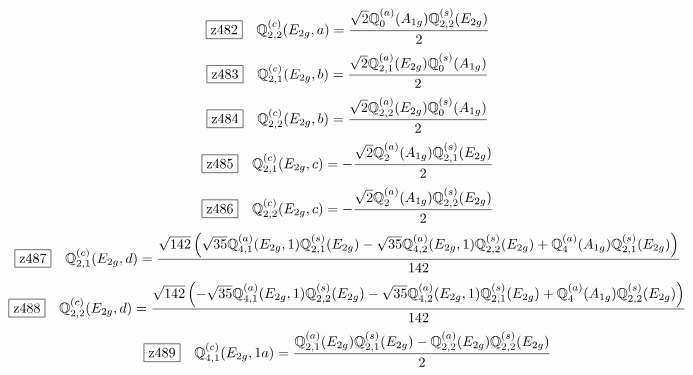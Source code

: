 \documentclass[fleqn,10pt,landscape]{jsarticle}
\begin{document}
\begin{dmath*}
\hspace*{3mm}\fbox{z482}\quad \mathbb{Q}_{2,2}^{(c)}(E_{2g},a)=\frac{\sqrt{2} \mathbb{Q}_{0}^{(a)}(A_{1g}) \mathbb{Q}_{2,2}^{(s)}(E_{2g})}{2}
\end{dmath*}
\begin{dmath*}
\hspace*{3mm}\fbox{z483}\quad \mathbb{Q}_{2,1}^{(c)}(E_{2g},b)=\frac{\sqrt{2} \mathbb{Q}_{2,1}^{(a)}(E_{2g}) \mathbb{Q}_{0}^{(s)}(A_{1g})}{2}
\end{dmath*}
\begin{dmath*}
\hspace*{3mm}\fbox{z484}\quad \mathbb{Q}_{2,2}^{(c)}(E_{2g},b)=\frac{\sqrt{2} \mathbb{Q}_{2,2}^{(a)}(E_{2g}) \mathbb{Q}_{0}^{(s)}(A_{1g})}{2}
\end{dmath*}
\begin{dmath*}
\hspace*{3mm}\fbox{z485}\quad \mathbb{Q}_{2,1}^{(c)}(E_{2g},c)=- \frac{\sqrt{2} \mathbb{Q}_{2}^{(a)}(A_{1g}) \mathbb{Q}_{2,1}^{(s)}(E_{2g})}{2}
\end{dmath*}
\begin{dmath*}
\hspace*{3mm}\fbox{z486}\quad \mathbb{Q}_{2,2}^{(c)}(E_{2g},c)=- \frac{\sqrt{2} \mathbb{Q}_{2}^{(a)}(A_{1g}) \mathbb{Q}_{2,2}^{(s)}(E_{2g})}{2}
\end{dmath*}
\begin{dmath*}
\hspace*{3mm}\fbox{z487}\quad \mathbb{Q}_{2,1}^{(c)}(E_{2g},d)=\frac{\sqrt{142} \left(\sqrt{35} \mathbb{Q}_{4,1}^{(a)}(E_{2g},1) \mathbb{Q}_{2,1}^{(s)}(E_{2g}) - \sqrt{35} \mathbb{Q}_{4,2}^{(a)}(E_{2g},1) \mathbb{Q}_{2,2}^{(s)}(E_{2g}) + \mathbb{Q}_{4}^{(a)}(A_{1g}) \mathbb{Q}_{2,1}^{(s)}(E_{2g})\right)}{142}
\end{dmath*}
\begin{dmath*}
\hspace*{3mm}\fbox{z488}\quad \mathbb{Q}_{2,2}^{(c)}(E_{2g},d)=\frac{\sqrt{142} \left(- \sqrt{35} \mathbb{Q}_{4,1}^{(a)}(E_{2g},1) \mathbb{Q}_{2,2}^{(s)}(E_{2g}) - \sqrt{35} \mathbb{Q}_{4,2}^{(a)}(E_{2g},1) \mathbb{Q}_{2,1}^{(s)}(E_{2g}) + \mathbb{Q}_{4}^{(a)}(A_{1g}) \mathbb{Q}_{2,2}^{(s)}(E_{2g})\right)}{142}
\end{dmath*}
\begin{dmath*}
\hspace*{3mm}\fbox{z489}\quad \mathbb{Q}_{4,1}^{(c)}(E_{2g},1a)=\frac{\mathbb{Q}_{2,1}^{(a)}(E_{2g}) \mathbb{Q}_{2,1}^{(s)}(E_{2g}) - \mathbb{Q}_{2,2}^{(a)}(E_{2g}) \mathbb{Q}_{2,2}^{(s)}(E_{2g})}{2}
\end{dmath*}
\end{document}
